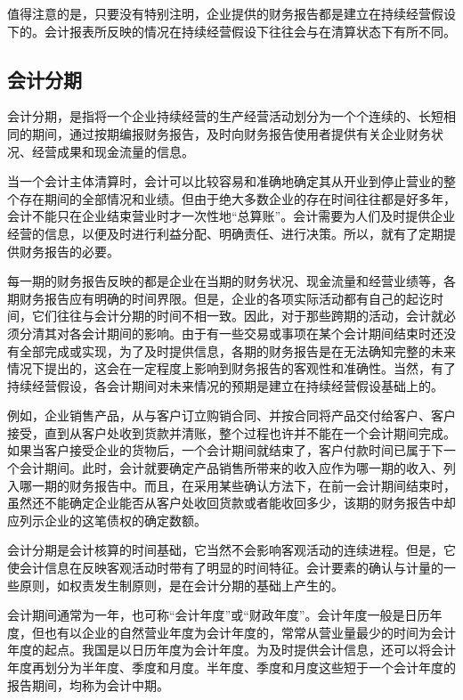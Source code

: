 		值得注意的是，只要没有特别注明，企业提供的财务报告都是建立在持续经营假设下的。会计报表所反映的情况在持续经营假设下往往会与在清算状态下有所不同。
		
		\subsection{会计分期}

		会计分期，是指将一个企业持续经营的生产经营活动划分为一个个连续的、长短相同的期间，通过按期编报财务报告，及时向财务报告使用者提供有关企业财务状况、经营成果和现金流量的信息。
		
		当一个会计主体清算时，会计可以比较容易和准确地确定其从开业到停止营业的整个存在期间的全部情况和业绩。但由于绝大多数企业的存在时间往往都是好多年，会计不能只在企业结束营业时才一次性地“总算账”。会计需要为人们及时提供企业经营的信息，以便及时进行利益分配、明确责任、进行决策。所以，就有了定期提供财务报告的必要。
		
		每一期的财务报告反映的都是企业在当期的财务状况、现金流量和经营业绩等，各期财务报告应有明确的时间界限。但是，企业的各项实际活动都有自己的起讫时间，它们往往与会计分期的时间不相一致。因此，对于那些跨期的活动，会计就必须分清其对各会计期间的影响。由于有一些交易或事项在某个会计期间结束时还没有全部完成或实现，为了及时提供信息，各期的财务报告是在无法确知完整的未来情况下提出的，这会在一定程度上影响到财务报告的客观性和准确性。当然，有了持续经营假设，各会计期间对未来情况的预期是建立在持续经营假设基础上的。
		
		例如，企业销售产品，从与客户订立购销合同、并按合同将产品交付给客户、客户接受，直到从客户处收到货款并清账，整个过程也许并不能在一个会计期间完成。如果当客户接受企业的货物后，一个会计期间就结束了，客户付款时间已属于下一个会计期间。此时，会计就要确定产品销售所带来的收入应作为哪一期的收入、列入哪一期的财务报告中。而且，在采用某些确认方法下，在前一会计期间结束时，虽然还不能确定企业能否从客户处收回货款或者能收回多少，该期的财务报告中却应列示企业的这笔债权的确定数额。
		
		会计分期是会计核算的时间基础，它当然不会影响客观活动的连续进程。但是，它使会计信息在反映客观活动时带有了明显的时间特征。会计要素的确认与计量的一些原则，如权责发生制原则，是在会计分期的基础上产生的。
		
		会计期间通常为一年，也可称“会计年度”或“财政年度”。会计年度一般是日历年度，但也有以企业的自然营业年度为会计年度的，常常从营业量最少的时间为会计年度的起点。我国是以日历年度为会计年度。为及时提供会计信息，还可以将会计年度再划分为半年度、季度和月度。半年度、季度和月度这些短于一个会计年度的报告期间，均称为会计中期。

